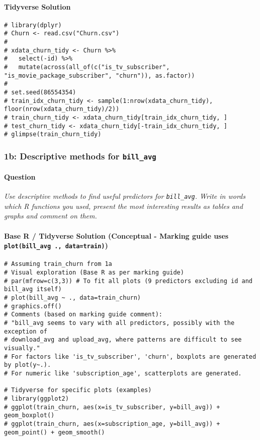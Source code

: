 \documentclass[12pt,a4paper]{article}
\newcommand{\Rcode}[1]{\texttt{#1}} %
\begin{document}
        \paragraph{Tidyverse Solution}
\begin{lstlisting}
# library(dplyr)
# Churn <- read.csv("Churn.csv")
# 
# xdata_churn_tidy <- Churn %>%
#   select(-id) %>%
#   mutate(across(all_of(c("is_tv_subscriber", "is_movie_package_subscriber", "churn")), as.factor))
# 
# set.seed(86554354)
# train_idx_churn_tidy <- sample(1:nrow(xdata_churn_tidy), floor(nrow(xdata_churn_tidy)/2))
# train_churn_tidy <- xdata_churn_tidy[train_idx_churn_tidy, ]
# test_churn_tidy <- xdata_churn_tidy[-train_idx_churn_tidy, ]
# glimpse(train_churn_tidy)
\end{lstlisting}

    \subsubsection{1b: Descriptive methods for \Rcode{bill\_avg}}
        \paragraph{Question}
        \textit{Use descriptive methods to find useful predictors for \Rcode{bill\_avg}. Write in words which R functions you used, present the most interesting results as tables and graphs and comment on them.}
        \paragraph{Base R / Tidyverse Solution (Conceptual - Marking guide uses \Rcode{plot(bill\_avg~., data=train)})}
\begin{lstlisting}
# Assuming train_churn from 1a
# Visual exploration (Base R as per marking guide)
# par(mfrow=c(3,3)) # To fit all plots (9 predictors excluding id and bill_avg itself)
# plot(bill_avg ~ ., data=train_churn)
# graphics.off()
# Comments (based on marking guide comment):
# "bill_avg seems to vary with all predictors, possibly with the exception of
# download_avg and upload_avg, where patterns are difficult to see visually."
# For factors like 'is_tv_subscriber', 'churn', boxplots are generated by plot(y~.).
# For numeric like 'subscription_age', scatterplots are generated.

# Tidyverse for specific plots (examples)
# library(ggplot2)
# ggplot(train_churn, aes(x=is_tv_subscriber, y=bill_avg)) + geom_boxplot()
# ggplot(train_churn, aes(x=subscription_age, y=bill_avg)) + geom_point() + geom_smooth()
\end{lstlisting}
\end{document}
